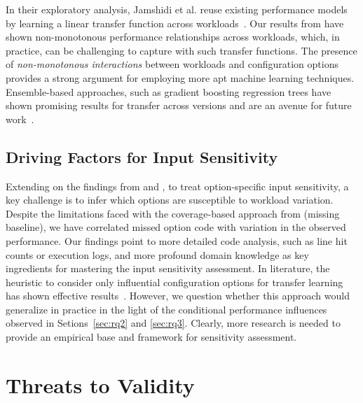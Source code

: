 {{In their exploratory analysis, Jamshidi et al. reuse existing performance models by learning a linear transfer function across workloads~\cite{jamishidi_transfer_2017}. Our results from  have shown non-monotonous performance relationships across workloads, which, in practice, can be challenging to capture with such transfer functions. The presence of \textit{non-monotonous interactions} between workloads and configuration options provides a strong argument for employing more apt machine learning techniques. Ensemble-based approaches, such as gradient boosting regression trees have shown promising results for transfer across versions and are an avenue for future work~\cite{martin_transfer_2021}.


\subsection{Driving Factors for Input Sensitivity}
Extending on the findings from  and , to treat option-specific input sensitivity, a key challenge is to infer which options are susceptible to workload variation. Despite the limitations faced with the coverage-based approach from  (missing baseline), we have correlated missed option code with variation in the observed performance. Our findings point to more detailed code analysis, such as line hit counts or execution logs, and more profound domain knowledge as key ingredients for mastering the input sensitivity assessment. In literature, the heuristic to consider only influential configuration options for transfer learning has shown effective results~\cite{jamshidi_learning_2018}. However, we question whether this approach would generalize in practice in the light of the conditional performance influences observed in Setions~\ref{sec:rq2} and \ref{sec:rq3}. Clearly, more research is needed to provide an empirical base and framework for sensitivity assessment.


\section{Threats to Validity}\label{sec:threats}

}}

